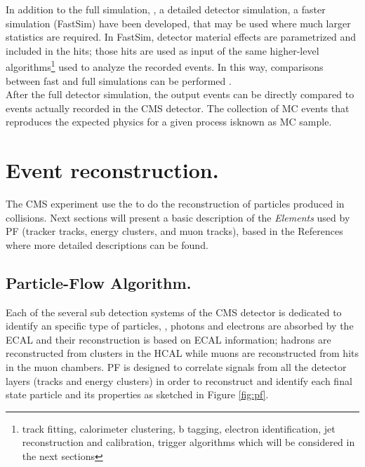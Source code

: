 \noindent In addition to the full simulation, \ie, a detailed detector simulation, a faster simulation (FastSim) have been developed, that may be used where much larger statistics are required. In FastSim, detector material effects are parametrized and included in the hits; those hits are used as input of the same higher-level algorithms\footnote{track fitting, calorimeter clustering, b tagging, electron identification, jet reconstruction and calibration, trigger algorithms which will be considered in the next sections} used to analyze the recorded events. In this way, comparisons between fast and full simulations can be performed \cite{fastsim}.\\

\noindent After the full detector simulation, the output events can be directly compared to events actually recorded in the CMS detector. The collection of MC events that reproduces the expected physics for a given process isknown as MC sample.

\section{Event reconstruction.}

\noindent %
The CMS experiment use the  to do the reconstruction of particles produced in \pp collisions. Next sections will present a basic description of the \textit{Elements} used by PF (tracker tracks, energy clusters, and muon tracks), based in the References \cite{particle_flow, particle_flow2} where more detailed descriptions can be found.  

\subsection{Particle-Flow Algorithm.}

\noindent Each of the several sub detection systems of the CMS detector is dedicated to identify an specific type of particles, \ie, photons and electrons are absorbed by the ECAL and their reconstruction is based on ECAL information; hadrons are reconstructed from clusters in the HCAL while muons are reconstructed from hits in the muon chambers. PF is designed to correlate signals from all the detector layers (tracks and energy clusters) in order to reconstruct and identify each final state particle and its properties as sketched in Figure \ref{fig:pf}.\\

